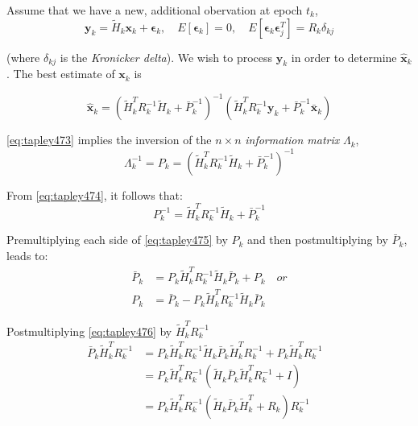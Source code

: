 Assume that we have a new, additional obervation at epoch \(t_k\),
\begin{equation}
  \bm{y}_k = \tilde{H}_k \bm{x}_k + \bm{\epsilon} _k ,
  \quad E\left[\bm{\epsilon} _k \right] = 0,
  \quad E\left[\bm{\epsilon} _k \bm{\epsilon} ^T_j \right] = R_k \delta _{kj}
\end{equation}

(where \(\delta _{kj}\) is the \emph{Kronicker delta}). We wish to process 
\(\bm{y} _k\) in order to determine \(\hat{\bm{x}} _k\). The best estimate of 
\(\bm{x} _k\) is

\begin{equation}
\label{eq:tapley473}
\hat{\bm{x}} _k = \left( \tilde{H}^T_k R^{-1}_k \tilde{H}_k + \bar{P}^{-1}_k \right)^{-1} \left( \tilde{H}^T_k R^{-1}_k \bm{y}_k + \bar{P}^{-1}_k \bar{\bm{x}}_k \right)
\end{equation}

\ref{eq:tapley473} implies the inversion of the \(n \times n\) \emph{information matrix} \(\Lambda _k\), 
\begin{equation}
\label{eq:tapley474}
\Lambda ^{-1}_k = P_k = 
\left( \tilde{H}^T_k R^{-1}_k \tilde{H}_k + \bar{P}^{-1}_k \right)^{-1}
\end{equation}

From \ref{eq:tapley474}, it follows that:
\begin{equation}
  \label{eq:tapley475}
  P^{-1}_k  
    = \tilde{H}^T_k R^{-1}_k \tilde{H}_k + \bar{P}^{-1}_k
\end{equation}

Premultiplying each side of \ref{eq:tapley475} by \(P_k\) and then postmultiplying 
by \(\bar{P}_k\), leads to:
\begin{subequations}
\begin{align}
  \bar{P}_k &= 
    P_k \tilde{H}^T_k R^{-1}_k \tilde{H}_k \bar{P}_k + P_k 
      \quad or \label{eq:tapley476} \\
  P_k &= 
    \bar{P}_k - P_k \tilde{H}^T_k R^{-1}_k \tilde{H}_k \bar{P}_k 
      \label{eq:tapley477}
  \end{align}
\end{subequations}

Postmultiplying \ref{eq:tapley476} by \(\tilde{H}^T_k R^{-1}_k\)
\begin{equation}
  \label{eq:tapley478}
  \begin{aligned}
  \bar{P}_k \tilde{H}^T_k R^{-1}_k &= 
    P_k \tilde{H}^T_k R^{-1}_k \tilde{H}_k \bar{P}_k \tilde{H}^T_k R^{-1}_k +
    P_k \tilde{H}^T_k R^{-1}_k & \\
  &= P_k \tilde{H}^T_k R^{-1}_k \left(
    \tilde{H}_k \bar{P}_k \tilde{H}^T_k R^{-1}_k + I \right) & \\
  &= P_k \tilde{H}^T_k R^{-1}_k \left(
     \tilde{H}_k \bar{P}_k \tilde{H}^T_k + R_k \right) R^{-1}_k &
  \end{aligned}
\end{equation}

